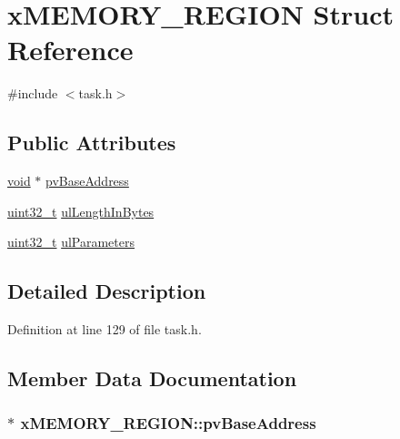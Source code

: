 \hypertarget{structx_m_e_m_o_r_y___r_e_g_i_o_n}{}\section{x\+M\+E\+M\+O\+R\+Y\+\_\+\+R\+E\+G\+I\+ON Struct Reference}
\label{structx_m_e_m_o_r_y___r_e_g_i_o_n}


{\ttfamily \#include $<$task.\+h$>$}

\subsection*{Public Attributes}
\begin{DoxyCompactItemize}
\item 
\hyperlink{usb__devapi_8h_afabf60e7f57651d6d595a02c75f07cd0}{void} $\ast$ \hyperlink{structx_m_e_m_o_r_y___r_e_g_i_o_n_a228036bbfdbc38f170e45deadb166172}{pv\+Base\+Address}
\item 
\hyperlink{_p_e___types_8h_a33594304e786b158f3fb30289278f5af}{uint32\+\_\+t} \hyperlink{structx_m_e_m_o_r_y___r_e_g_i_o_n_a97e59578d3c4c46270d33e7206258a65}{ul\+Length\+In\+Bytes}
\item 
\hyperlink{_p_e___types_8h_a33594304e786b158f3fb30289278f5af}{uint32\+\_\+t} \hyperlink{structx_m_e_m_o_r_y___r_e_g_i_o_n_a6ba180553e9a318f23acc5f4664934e3}{ul\+Parameters}
\end{DoxyCompactItemize}


\subsection{Detailed Description}


Definition at line 129 of file task.\+h.



\subsection{Member Data Documentation}
\subsubsection[{\texorpdfstring{pv\+Base\+Address}{pvBaseAddress}}]{$\ast$ x\+M\+E\+M\+O\+R\+Y\+\_\+\+R\+E\+G\+I\+O\+N\+::pv\+Base\+Address}\hypertarget{structx_m_e_m_o_r_y___r_e_g_i_o_n_a228036bbfdbc38f170e45deadb166172}{}\label{structx_m_e_m_o_r_y___r_e_g_i_o_n_a228036bbfdbc38f170e45deadb166172}


